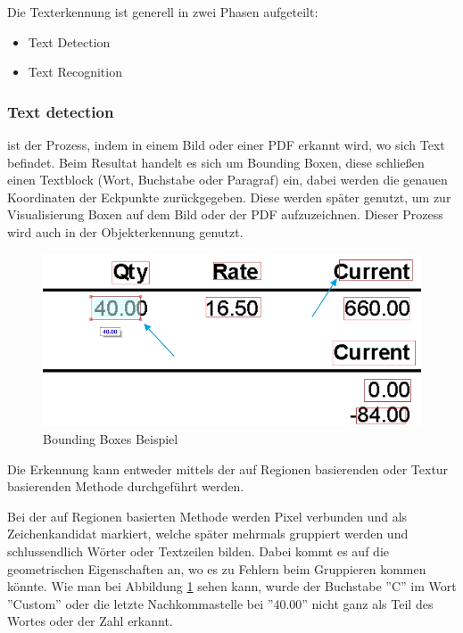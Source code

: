 Die Texterkennung ist generell in zwei Phasen aufgeteilt:

\begin{itemize}
    \item Text Detection
    \item Text Recognition
\end{itemize}

\subsubsection{Text detection} ist der Prozess, indem in einem Bild oder einer PDF erkannt wird, wo sich Text befindet. Beim Resultat handelt es sich um Bounding Boxen, diese schließen einen Textblock (Wort, Buchstabe oder Paragraf) ein, dabei werden die genauen Koordinaten der Eckpunkte zurückgegeben. Diese werden später genutzt, um zur Visualisierung Boxen auf dem Bild oder der PDF aufzuzeichnen. Dieser Prozess wird auch in der Objekterkennung genutzt.

\begin{figure}[H]
    \includegraphics[scale=0.5]{sections/machine-learning/images/bounding-boxes.png}
    \caption{Bounding Boxes Beispiel}
    \label{fig:bounding-boxes}
\end{figure}

Die Erkennung kann entweder mittels der auf Regionen basierenden oder Textur basierenden Methode durchgeführt werden.

Bei der auf Regionen basierten Methode werden Pixel verbunden und als Zeichenkandidat markiert, welche später mehrmals gruppiert werden und schlussendlich Wörter oder Textzeilen bilden. Dabei kommt es auf die geometrischen Eigenschaften an, wo es zu Fehlern beim Gruppieren kommen könnte. Wie man bei Abbildung \ref{fig:bounding-boxes} sehen kann, wurde der Buchstabe ''C'' im Wort ''Custom'' oder die letzte Nachkommastelle bei ''40.00'' nicht ganz als Teil des Wortes oder der Zahl erkannt.

